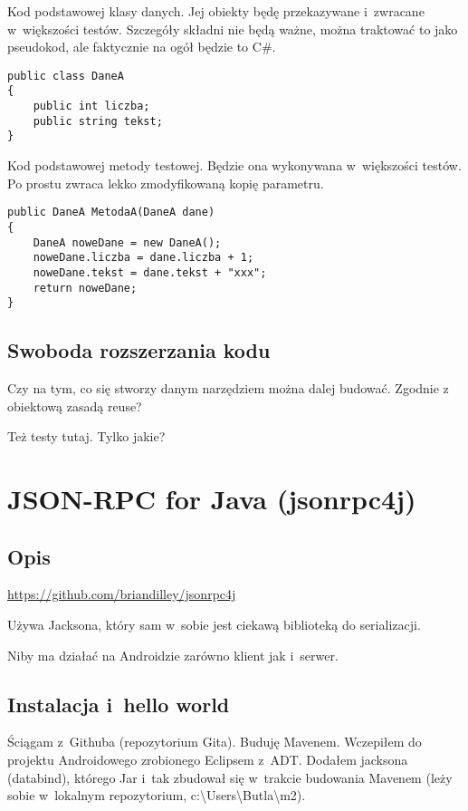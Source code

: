 Kod podstawowej klasy danych. Jej obiekty będę przekazywane i~zwracane w~większości testów.
Szczegóły składni nie będą ważne, można traktować to jako pseudokod, ale faktycznie na ogół będzie to C\#.

\begin{lstlisting}[frame=single, caption={Przykładowa klasa danych używana w testach polimorfizmu zdalnych metod}, label=kod:testData]
public class DaneA
{
	public int liczba;
	public string tekst;
}
\end{lstlisting}

Kod podstawowej metody testowej. Będzie ona wykonywana w~większości testów.
Po prostu zwraca lekko zmodyfikowaną kopię parametru.

\begin{lstlisting}[frame=single, caption={Przykładowa zdalna metoda testowana pod kątem polimorfizmu}, label=kod:testMethod]
public DaneA MetodaA(DaneA dane)
{
	DaneA noweDane = new DaneA();
	noweDane.liczba = dane.liczba + 1;
	noweDane.tekst = dane.tekst + "xxx";	
	return noweDane;
}
\end{lstlisting}

\subsection{Swoboda rozszerzania kodu}
Czy na tym, co się stworzy danym narzędziem można dalej budować. Zgodnie z obiektową zasadą reuse?

Też testy tutaj. Tylko jakie?



\section{JSON-RPC for Java (jsonrpc4j)}
\subsection{Opis}
\url{https://github.com/briandilley/jsonrpc4j}

Używa Jacksona, który sam w~sobie jest ciekawą biblioteką do serializacji.

Niby ma działać na Androidzie zarówno klient jak i~serwer.

\subsection{Instalacja i~hello world}
Ściągam z~Githuba (repozytorium Gita).
Buduję Mavenem.
Wczepiłem do projektu Androidowego zrobionego Eclipsem z~ADT.
Dodałem jacksona (databind), którego Jar i~tak zbudował się w~trakcie budowania Mavenem (leży sobie w~lokalnym repozytorium, c:\textbackslash{}Users\textbackslash{}Butla\textbackslash{}m2).

